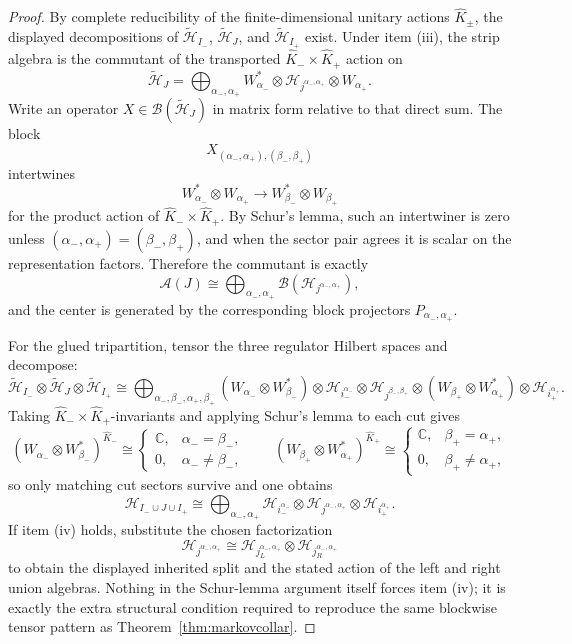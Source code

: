 \documentclass[11pt]{article}
\begin{document}
\begin{proof}
By complete reducibility of the finite-dimensional unitary actions \(\widehat K_\pm\), the displayed decompositions of \(\tilde{\mathcal H}_{I_-}\), \(\tilde{\mathcal H}_J\), and \(\tilde{\mathcal H}_{I_+}\) exist. Under item (iii), the strip algebra is the commutant of the transported \(\widehat K_-\times \widehat K_+\) action on
\[
\tilde{\mathcal H}_J
=
\bigoplus_{\alpha_-,\alpha_+}
W_{\alpha_-}^{*}\otimes
\mathcal H_{j^{\alpha_-,\alpha_+}}\otimes
W_{\alpha_+}.
\]
Write an operator \(X\in \mathcal B(\tilde{\mathcal H}_J)\) in matrix form relative to that direct sum. The block
\[
X_{(\alpha_-,\alpha_+),(\beta_-,\beta_+)}
\]
intertwines
\[
W_{\alpha_-}^{*}\otimes W_{\alpha_+}
\longrightarrow
W_{\beta_-}^{*}\otimes W_{\beta_+}
\]
for the product action of \(\widehat K_-\times \widehat K_+\). By Schur's lemma, such an intertwiner is zero unless \((\alpha_-,\alpha_+)=(\beta_-,\beta_+)\), and when the sector pair agrees it is scalar on the representation factors. Therefore the commutant is exactly
\[
\mathcal A(J)
\cong
\bigoplus_{\alpha_-,\alpha_+}
\mathcal B(\mathcal H_{j^{\alpha_-,\alpha_+}}),
\]
and the center is generated by the corresponding block projectors \(P_{\alpha_-,\alpha_+}\).

For the glued tripartition, tensor the three regulator Hilbert spaces and decompose:
\[
\tilde{\mathcal H}_{I_-}\otimes \tilde{\mathcal H}_{J}\otimes \tilde{\mathcal H}_{I_+}
\cong
\bigoplus_{\alpha_-,\beta_-,\alpha_+,\beta_+}
(W_{\alpha_-}\otimes W_{\beta_-}^{*})
\otimes
\mathcal H_{i_-^{\alpha_-}}
\otimes
\mathcal H_{j^{\beta_-,\beta_+}}
\otimes
(W_{\beta_+}\otimes W_{\alpha_+}^{*})
\otimes
\mathcal H_{i_+^{\alpha_+}}.
\]
Taking \(\widehat K_-\times\widehat K_+\)-invariants and applying Schur's lemma to each cut gives
\[
(W_{\alpha_-}\otimes W_{\beta_-}^{*})^{\widehat K_-}
\cong
\begin{cases}
\mathbb C, & \alpha_-=\beta_-,\\
0, & \alpha_-\neq \beta_-,
\end{cases}
\qquad
(W_{\beta_+}\otimes W_{\alpha_+}^{*})^{\widehat K_+}
\cong
\begin{cases}
\mathbb C, & \beta_+=\alpha_+,\\
0, & \beta_+\neq \alpha_+,
\end{cases}
\]
so only matching cut sectors survive and one obtains
\[
\mathcal H_{I_-\cup J\cup I_+}
\cong
\bigoplus_{\alpha_-,\alpha_+}
\mathcal H_{i_-^{\alpha_-}}\otimes
\mathcal H_{j^{\alpha_-,\alpha_+}}\otimes
\mathcal H_{i_+^{\alpha_+}}.
\]
If item (iv) holds, substitute the chosen factorization
\[
\mathcal H_{j^{\alpha_-,\alpha_+}}
\cong
\mathcal H_{j_L^{\alpha_-,\alpha_+}}\otimes
\mathcal H_{j_R^{\alpha_-,\alpha_+}}
\]
to obtain the displayed inherited split and the stated action of the left and right union algebras. Nothing in the Schur-lemma argument itself forces item (iv); it is exactly the extra structural condition required to reproduce the same blockwise tensor pattern as Theorem~\ref{thm:markovcollar}.
\end{proof}
\end{document}
